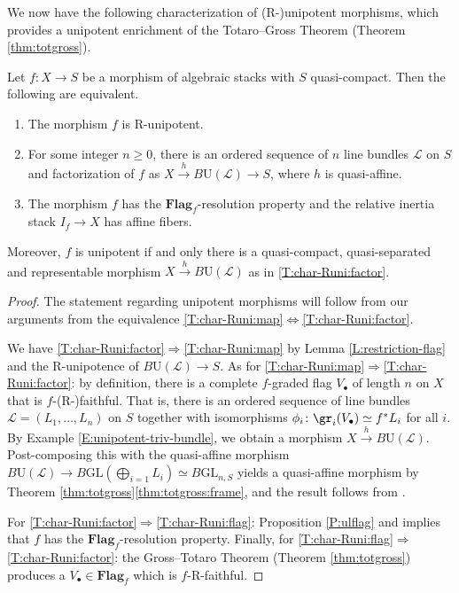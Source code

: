 \documentclass[reqno,a4paper]{amsart}
\numberwithin{Theorem}{section}
\renewcommand{\GL}{\mathrm{GL}}
\renewcommand{\U}{\mathrm{U}}
\newcommand{\Flag}{\mathbf{Flag}}
\theoremstyle{plain}
\theoremstyle{remark}
\newcommand{\classB}{B}
\begin{document}
We now have the
following characterization of (R-)unipotent morphisms, which provides
a unipotent enrichment of the Totaro--Gross Theorem (Theorem
\ref{thm:totgross}).
\begin{Theorem}\label{T:char-Runi}
  Let $f\colon X \to S$ be a morphism of algebraic stacks with $S$
  quasi-compact. Then the following are equivalent.
  \begin{enumerate}
  \item\label{T:char-Runi:map} The morphism $f$ is R-unipotent.
  \item\label{T:char-Runi:factor} For some integer $n \geq 0$, there
    is an ordered sequence of $n$ line bundles $\mathscr{L}$ on $S$
    and factorization of $f$ as
    $X \xrightarrow{h} \classB \U(\mathscr{L}) \to S$, where $h$ is
    quasi-affine.
  \item\label{T:char-Runi:flag} The morphism $f$ has the $\Flag_f$-resolution
    property and the relative inertia stack $I_f \to X$ has affine
    fibers.
  \end{enumerate} 
  Moreover, $f$ is unipotent if and only there is a quasi-compact, quasi-separated and representable morphism $X \xrightarrow{h} \classB \U(\mathscr{L})$
  as in \eqref{T:char-Runi:factor}.
\end{Theorem}
\begin{proof}
  The statement regarding unipotent morphisms will follow from our
  arguments from the equivalence
  \eqref{T:char-Runi:map}$\Leftrightarrow$\eqref{T:char-Runi:factor}.

  We have \eqref{T:char-Runi:factor}$\Rightarrow$\eqref{T:char-Runi:map} by Lemma \ref{L:restriction-flag} and the
  R-unipotence of $\classB\U(\mathscr{L}) \to S$. As for
  \eqref{T:char-Runi:map}$\Rightarrow$\eqref{T:char-Runi:factor}: by
  definition, there is a complete $f$-graded flag $V_\bullet$ of
  length $n$ on $X$ that is $f$-(R-)faithful. That is, there is an
  ordered sequence of line bundles $\mathscr{L} = (L_1,\dots,L_n)$ on
  $S$ together with isomorphisms
  $\phi_i \colon \gr_i(V_\bullet) \simeq f^*L_i$ for all $i$. By
  Example \ref{E:unipotent-triv-bundle}, we obtain a morphism
  $X \xrightarrow{h} \classB \U(\mathscr{L})$. Post-composing this
  with the quasi-affine morphism
  $\classB \U(\mathscr{L}) \to \classB \GL(\bigoplus_{i=1}L_i) \simeq
  \classB \GL_{n,S}$ yields a quasi-affine morphism by Theorem \ref{thm:totgross}\eqref{thm:totgross:frame}, and the result follows from \cite[Tag 054G]{stacks-project}.
  
  For \eqref{T:char-Runi:factor}$\Rightarrow$\eqref{T:char-Runi:flag}: Proposition \ref{P:ulflag} and
  \cite[Prop.\ 2.8(v)]{2013arXiv1306.5418G} implies that $f$ has the
  $\Flag_f$-resolution property. Finally, for
  \eqref{T:char-Runi:flag}$\Rightarrow$\eqref{T:char-Runi:factor}: the
  Gross--Totaro Theorem (Theorem \ref{thm:totgross}) produces a
  $V_{\bullet} \in \Flag_f$ which is $f$-R-faithful.
\end{proof}
\end{document}
